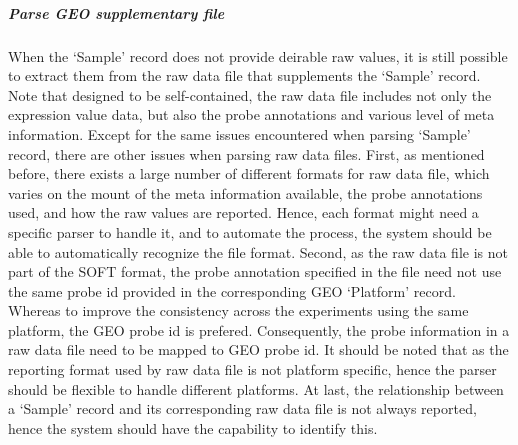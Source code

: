 \subparagraph{\textit{Parse GEO supplementary file}}

When the `Sample' record does not provide deirable raw values, it is still
possible to extract them from the raw data file that supplements the `Sample'
record.
%
Note that designed to be self-contained, the raw data file includes not only
the expression value data, but also the probe annotations and various level
of meta information.
%
Except for the same issues encountered when parsing `Sample' record, there
are other issues when parsing raw data files.
First, as mentioned before, there exists a large number of different formats
for raw data file, which varies on the mount of the meta information available,
the probe annotations used, and how the raw values are reported.
%
Hence, each format might need a specific parser to handle it, and to automate
the process, the system should be able to automatically recognize the file
format.
Second, as the raw data file is not part of the SOFT format, the probe
annotation specified in the file need not use the same probe id provided in
the corresponding GEO `Platform' record.
%
Whereas to improve the consistency across the experiments using the same
platform, the GEO probe id is prefered.
%
Consequently, the probe information in a raw data file need to be mapped to
GEO probe id.
It should be noted that as the reporting format used by raw data file is not
platform specific, hence the parser should be flexible to handle different
platforms.
%
At last, the relationship between a `Sample' record and its corresponding
raw data file is not always reported, hence the system should have the
capability to identify this.


